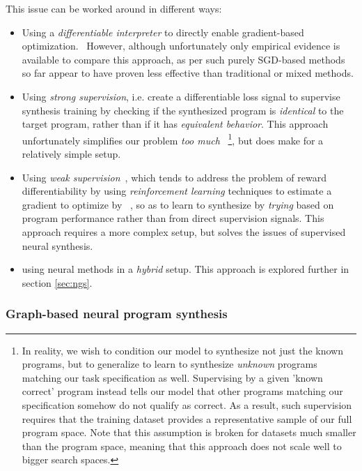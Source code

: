 \documentclass{article}
\begin{document}
This issue can be worked around in different ways:
\begin{itemize}
    \item Using a \emph{differentiable interpreter} to directly enable gradient-based optimization.~\citep{forth,terpret,houdini,feser2016differentiable,rocktaschel2017end}
        However, although unfortunately only empirical evidence is available to compare this approach, as per \citet{terpret} such purely SGD-based methods so far appear to have proven less effective than traditional or mixed methods.
    \item Using \emph{strong supervision}, i.e. create a differentiable loss signal
        to supervise synthesis training by checking if the synthesized program is \emph{identical} to the target program,
        rather than if it has \emph{equivalent behavior}.
        This approach unfortunately simplifies our problem \emph{too much}%
        ~\footnote{
            In reality, we wish to condition our model to synthesize not just the known programs,
            but to generalize to learn to synthesize \emph{unknown} programs matching our task specification as well.
            Supervising by a given 'known correct' program instead tells our model that other programs matching our specification somehow do not qualify as correct.
            As a result, such supervision requires that the training dataset provides a representative sample of our full program space.
            Note that this assumption is broken for datasets much smaller than the program space,
            meaning that this approach does not scale well to bigger search spaces.
        }, but does make for a relatively simple setup.
    \item Using \emph{weak supervision}~\citep{mapo},
        which tends to address the problem of reward differentiability by using \emph{reinforcement learning} techniques to estimate a gradient to optimize by%
        ~\citep{chen2017towards,bunel2018leveraging,xu2019neural,camacho2019towards},
        so as to learn to synthesize by \emph{trying} based on program performance rather than from direct supervision signals.
        This approach requires a more complex setup, but solves the issues of supervised neural synthesis.
    \item using neural methods in a \emph{hybrid} setup. This approach is explored further in section \ref{sec:ngs}.
\end{itemize}

\subsubsection{Graph-based neural program synthesis}
\end{document}
